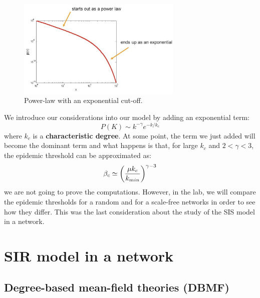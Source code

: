 \documentclass[../main/main.tex]{subfiles}
\begin{document}
\begin{figure}[h!]
\centering
\includegraphics[width=0.7\textwidth]{../lessons/image/07/2.png}
\caption{\label{fig:07_2} Power-law with an exponential cut-off.}
\end{figure}

We introduce our considerations into our model by adding an exponential term:
 \begin{equation}
   P(K) \sim k^{- \gamma}   e^{-k/k_c}
 \end{equation}
where \( k_c \) is a \textbf{characteristic degree}.
At some point, the term we just added will become the dominant term and what happens is that, for large \( k_c \) and \( 2 < \gamma < 3  \), the epidemic threshold can be approximated as:
\begin{equation}
  \beta _c \simeq \qty(\frac{\mu k_c}{k_{min}})^{\gamma -3 }
\end{equation}
we are not going to prove the computations. However, in the lab, we will compare the epidemic thresholds for a random and for a scale-free networks in order to see how they differ. This was the last consideration about the study of the SIS model in a network.



\section{SIR model in a network}

\subsection{Degree-based mean-field theories (DBMF)}
\end{document}
